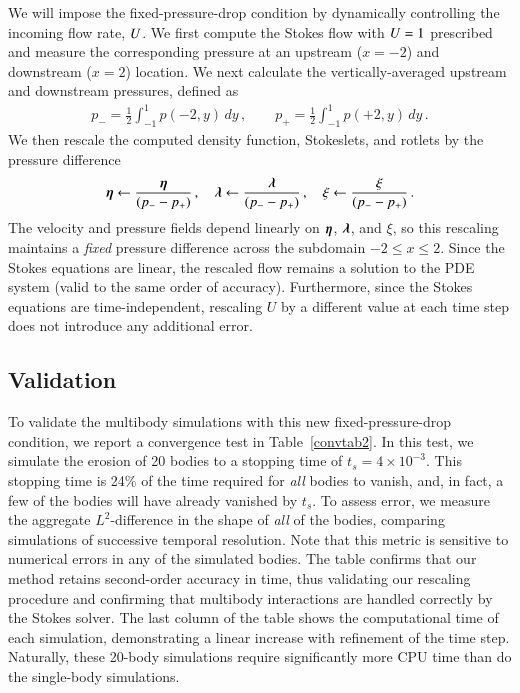 \documentclass[preprint, 10pt]{elsarticle}
\begin{document}
We will impose the fixed-pressure-drop condition by dynamically controlling the incoming flow rate, $U$. We first compute the Stokes flow with $U = 1$ prescribed and measure the corresponding pressure at an upstream ($x = -2$) and downstream ($x=2$) location. We next calculate the vertically-averaged upstream and downstream pressures, defined as
\begin{align}
p_{-} = \frac{1}{2} \int_{-1}^{1} p(-2,y) \, dy \, , \qquad
p_{+} = \frac{1}{2} \int_{-1}^{1} p(+2,y) \, dy \, .
\end{align}
We then rescale the computed density function, Stokeslets, and rotlets  by the pressure difference
\begin{align}
{\boldsymbol\eta} \leftarrow \frac{{\boldsymbol\eta}}{(p_{-} - p_{+})}\, , \quad 
{\boldsymbol\lambda} \leftarrow \frac{{\boldsymbol\lambda}}{(p_{-} - p_{+})}\, , \quad 
\xi \leftarrow \frac{\xi}{(p_{-} - p_{+})}\, .
\end{align}
The velocity and pressure fields depend linearly on ${\boldsymbol\eta}$, ${\boldsymbol\lambda}$, and $\xi$, so this rescaling maintains a {\em fixed} pressure difference across the subdomain $-2 \le x \le 2$. Since the Stokes equations are linear, the rescaled flow remains a solution to the PDE system (valid to the same order of accuracy). Furthermore, since the Stokes equations are time-independent, rescaling $U$ by a different value at each time step does not introduce any additional error.

\subsection{Validation}

To validate the multibody simulations with this new fixed-pressure-drop condition, we report a convergence test in Table~\ref{convtab2}. In this test, we simulate the erosion of 20 bodies to a stopping time of $t_s = 4 \times 10^{-3}$. This stopping time is 24\% of the time required for {\em all} bodies to vanish, and, in fact, a few of the bodies will have already vanished by $t_s$. To assess error, we measure the aggregate $L^2$-difference in the shape of {\em all} of the bodies, comparing simulations of successive temporal resolution. Note that this metric is sensitive to numerical errors in any of the simulated bodies. The table confirms that our method retains second-order accuracy in time, thus validating our rescaling procedure and confirming that multibody interactions are handled correctly by the Stokes solver. The last column of the table shows the computational time of each simulation, demonstrating a linear increase with refinement of the time step. Naturally, these 20-body simulations require significantly more CPU time than do the single-body simulations.
\end{document}
